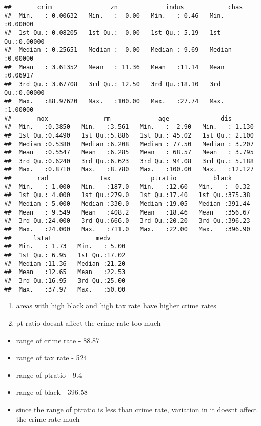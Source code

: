 \documentclass[
]{article}
\providecommand{\tightlist}{%
  \setlength{\itemsep}{0pt}\setlength{\parskip}{0pt}}
\begin{document}
\begin{verbatim}
##       crim                zn             indus            chas        
##  Min.   : 0.00632   Min.   :  0.00   Min.   : 0.46   Min.   :0.00000  
##  1st Qu.: 0.08205   1st Qu.:  0.00   1st Qu.: 5.19   1st Qu.:0.00000  
##  Median : 0.25651   Median :  0.00   Median : 9.69   Median :0.00000  
##  Mean   : 3.61352   Mean   : 11.36   Mean   :11.14   Mean   :0.06917  
##  3rd Qu.: 3.67708   3rd Qu.: 12.50   3rd Qu.:18.10   3rd Qu.:0.00000  
##  Max.   :88.97620   Max.   :100.00   Max.   :27.74   Max.   :1.00000  
##       nox               rm             age              dis        
##  Min.   :0.3850   Min.   :3.561   Min.   :  2.90   Min.   : 1.130  
##  1st Qu.:0.4490   1st Qu.:5.886   1st Qu.: 45.02   1st Qu.: 2.100  
##  Median :0.5380   Median :6.208   Median : 77.50   Median : 3.207  
##  Mean   :0.5547   Mean   :6.285   Mean   : 68.57   Mean   : 3.795  
##  3rd Qu.:0.6240   3rd Qu.:6.623   3rd Qu.: 94.08   3rd Qu.: 5.188  
##  Max.   :0.8710   Max.   :8.780   Max.   :100.00   Max.   :12.127  
##       rad              tax           ptratio          black       
##  Min.   : 1.000   Min.   :187.0   Min.   :12.60   Min.   :  0.32  
##  1st Qu.: 4.000   1st Qu.:279.0   1st Qu.:17.40   1st Qu.:375.38  
##  Median : 5.000   Median :330.0   Median :19.05   Median :391.44  
##  Mean   : 9.549   Mean   :408.2   Mean   :18.46   Mean   :356.67  
##  3rd Qu.:24.000   3rd Qu.:666.0   3rd Qu.:20.20   3rd Qu.:396.23  
##  Max.   :24.000   Max.   :711.0   Max.   :22.00   Max.   :396.90  
##      lstat            medv      
##  Min.   : 1.73   Min.   : 5.00  
##  1st Qu.: 6.95   1st Qu.:17.02  
##  Median :11.36   Median :21.20  
##  Mean   :12.65   Mean   :22.53  
##  3rd Qu.:16.95   3rd Qu.:25.00  
##  Max.   :37.97   Max.   :50.00
\end{verbatim}

\begin{enumerate}
\def\labelenumi{\arabic{enumi}.}
\tightlist
\item
  areas with high black and high tax rate have higher crime rates
\item
  pt ratio doesnt affect the crime rate too much
\end{enumerate}

\begin{itemize}
\tightlist
\item
  range of crime rate - 88.87
\item
  range of tax rate - 524
\item
  range of ptratio - 9.4
\item
  range of black - 396.58
\item
  since the range of ptratio is less than crime rate, variation in it
  doesnt affect the crime rate much
\end{itemize}
\end{document}

